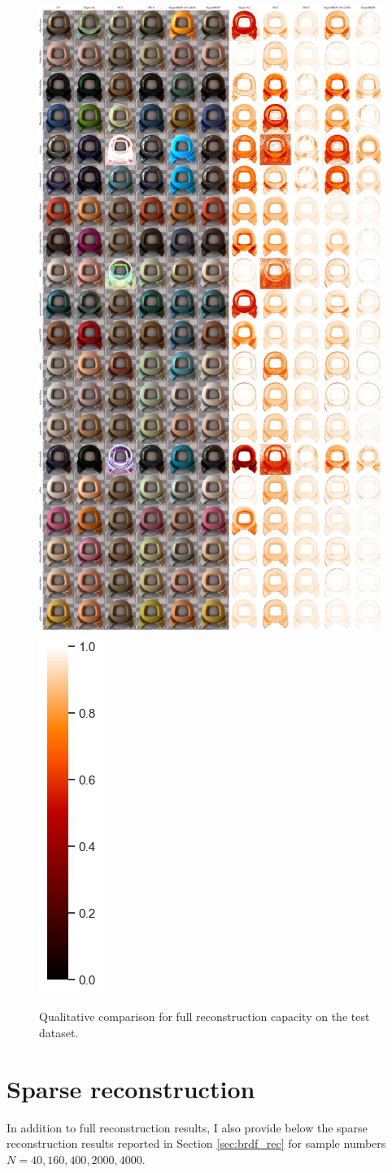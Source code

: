 \begin{figure}[ht]
  \centering
{}%
  {\includegraphics[width=0.66\linewidth]{Chapters/appendix-figs/qualitative_comp_40_all_samples-compressed.pdf}}
    \includegraphics[width=0.02\linewidth]{Chapters/hyperbrdf-figs/vbar.png}

   \caption{Qualitative comparison for full reconstruction capacity on the test dataset.}

   \label{fig:qual_comp}
\end{figure}


\newpage
\section{Sparse reconstruction}
In addition to full reconstruction results, I also provide below the sparse reconstruction results reported in Section \ref{sec:brdf_rec} for sample numbers $N = 40, 160, 400, 2000, 4000$.

